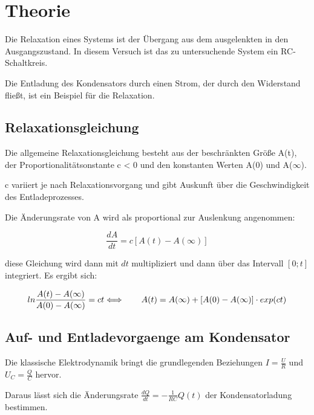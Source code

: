 \section{Theorie}
\label{sec:Theorie}

Die Relaxation eines Systems ist der Übergang aus dem ausgelenkten in den Ausgangszustand.
In diesem Versuch ist das zu untersuchende System ein RC-Schaltkreis.

Die Entladung des Kondensators durch einen Strom, der durch den Widerstand fließt, 
ist ein Beispiel für die Relaxation.

\subsection{Relaxationsgleichung}
\label{subsec:Die Relaxationsgleichung}

Die allgemeine Relaxationsgleichung besteht aus der beschränkten Größe A(t), der Proportionalitätsonstante c < 0 
und den konstanten
Werten A(0) und A($\infty$).

c variiert je nach Relaxationsvorgang und gibt Auskunft über die Geschwindigkeit des Entladeprozesses.

Die Änderungsrate von A wird als proportional zur Auslenkung angenommen:

\begin{equation} 
    \label{Rel_allg}
\frac{dA}{dt} = c[A(t)-A(\infty)]
\end{equation}

diese Gleichung wird dann mit $dt$ multipliziert und dann über das Intervall $[0; t]$ integriert. 
Es ergibt sich:

\begin{equation} 
    \label{Rel_RC}
ln\frac{A(t)-A(\infty)}{A(0)-A(\infty)} = ct \\
\Longleftrightarrow\qquad A(t) = A(\infty) + [A(0)-A(\infty)] \cdot exp(ct)
\end{equation}


\subsection{Auf- und Entladevorgaenge am Kondensator}
\label{subsec:Entladevorgaenge am Kondensator}

Die klassische Elektrodynamik bringt die grundlegenden Beziehungen $I = \frac{U}{R}$ und $U_C = \frac{Q}{C}$ 
hervor.

Daraus lässt sich die Änderungsrate $\frac{dQ}{dt} = -\frac{1}{RC}Q(t)$ der Kondensatorladung bestimmen. 

